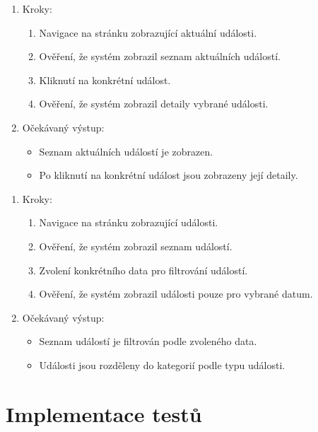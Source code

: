 \begin{enumerate}
  \item Kroky:
    \begin{enumerate}
      \item Navigace na stránku zobrazující aktuální události.
      \item Ověření, že systém zobrazil seznam aktuálních událostí.
      \item Kliknutí na konkrétní událost.
      \item Ověření, že systém zobrazil detaily vybrané události.
    \end{enumerate}
  \item Očekávaný výstup:
    \begin{itemize}
      \item Seznam aktuálních událostí je zobrazen.
      \item Po kliknutí na konkrétní událost jsou zobrazeny její detaily.
    \end{itemize}
\end{enumerate}


\begin{enumerate}
  \item Kroky:
    \begin{enumerate}
      \item Navigace na stránku zobrazující události.
      \item Ověření, že systém zobrazil seznam událostí.
      \item Zvolení konkrétního data pro filtrování událostí.
      \item Ověření, že systém zobrazil události pouze pro vybrané datum.
    \end{enumerate}
  \item Očekávaný výstup:
    \begin{itemize}
      \item Seznam událostí je filtrován podle zvoleného data.
      \item Události jsou rozděleny do kategorií podle typu události.
    \end{itemize}
\end{enumerate}

\section{Implementace testů}


